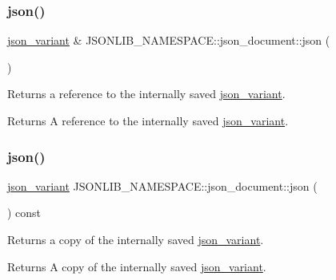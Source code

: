 \subsubsection{\texorpdfstring{json()}{json()}\hspace{0.1cm}{\footnotesize\ttfamily [1/4]}}
{\footnotesize\ttfamily \hyperlink{classJSONLIB__NAMESPACE_1_1json__variant}{json\+\_\+variant} \& J\+S\+O\+N\+L\+I\+B\+\_\+\+N\+A\+M\+E\+S\+P\+A\+C\+E\+::json\+\_\+document\+::json (\begin{DoxyParamCaption}{ }\end{DoxyParamCaption})}



Returns a reference to the internally saved \hyperlink{classJSONLIB__NAMESPACE_1_1json__variant}{json\+\_\+variant}. 

\begin{DoxyReturn}{Returns}
A reference to the internally saved \hyperlink{classJSONLIB__NAMESPACE_1_1json__variant}{json\+\_\+variant}. 
\end{DoxyReturn}
\mbox{\label{classJSONLIB__NAMESPACE_1_1json__document_afc25f82f6d2729be0ae1bcc82b8968e3}} 
\subsubsection{\texorpdfstring{json()}{json()}\hspace{0.1cm}{\footnotesize\ttfamily [2/4]}}
{\footnotesize\ttfamily \hyperlink{classJSONLIB__NAMESPACE_1_1json__variant}{json\+\_\+variant} J\+S\+O\+N\+L\+I\+B\+\_\+\+N\+A\+M\+E\+S\+P\+A\+C\+E\+::json\+\_\+document\+::json (\begin{DoxyParamCaption}{ }\end{DoxyParamCaption}) const}



Returns a copy of the internally saved \hyperlink{classJSONLIB__NAMESPACE_1_1json__variant}{json\+\_\+variant}. 

\begin{DoxyReturn}{Returns}
A copy of the internally saved \hyperlink{classJSONLIB__NAMESPACE_1_1json__variant}{json\+\_\+variant}. 
\end{DoxyReturn}
\mbox{\label{classJSONLIB__NAMESPACE_1_1json__document_a8e43f6245c1ea943aba53f4341190291}} 
